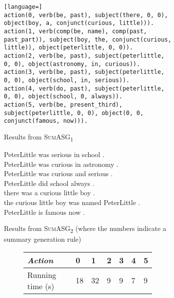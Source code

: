 \begin{figure}[H]
\begin{subfigure}{\textwidth}
\begin{displayquote}
\begin{lstlisting}[language=]
action(0, verb(be, past), subject(there, 0, 0), object(boy, a, conjunct(curious, little))).
action(1, verb(comp(be, name), comp(past, past_part)), subject(boy, the, conjunct(curious, little)), object(peterlittle, 0, 0)).
action(2, verb(be, past), subject(peterlittle, 0, 0), object(astronomy, in, curious)).
action(3, verb(be, past), subject(peterlittle, 0, 0), object(school, in, serious)).
action(4, verb(do, past), subject(peterlittle, 0, 0), object(school, 0, always)).
action(5, verb(be, present_third), subject(peterlittle, 0, 0), object(0, 0, conjunct(famous, now))).
\end{lstlisting}
\end{displayquote}
\caption{Results from \textsc{SumASG\textsubscript{1}}}
\end{subfigure}
\begin{subfigure}{\textwidth}
\vspace{\baselineskip}
\begin{displayquote}
 PeterLittle was serious in school .\\
 PeterLittle was curious in astronomy .\\
 PeterLittle was curious and serious .\\
 PeterLittle did school always .\\
 there was a curious little boy .\\
 the curious little boy was named PeterLittle .\\
 PeterLittle is famous now .
\end{displayquote}
\caption{Results from \textsc{SumASG\textsubscript{2}} (where the numbers indicate a summary generation rule)}
\end{subfigure}
\setcounter{subfigure}{0}
\begin{subfigure}{\textwidth}
\vspace{\baselineskip}
\begin{subfigure}{0.5\textwidth}
\renewcommand\thesubfigure{\roman{subfigure}}
\centering
\begin{tabular}{@{}lllllll@{}}
\toprule
\textit{Action}         & 0  & 1  & 2 & 3 & 4 & 5 \\ \midrule
Running time (s) & 18 & 32 & 9 & 9 & 7 & 9 \\ \bottomrule

\end{tabular}
\end{subfigure}
\end{subfigure}
\end{figure}
